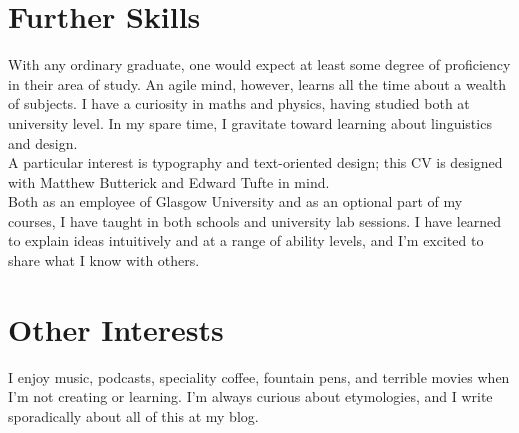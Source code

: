 \documentclass{tufte-handout}
\begin{document}
\section{Further Skills}
With any ordinary graduate, one would expect at least some degree of proficiency in their area of study. An agile mind, however, learns all the time about a wealth of subjects. I have a curiosity in maths and physics, having studied both at university level. In my spare time, I gravitate toward learning about linguistics and design.\\
A particular interest is typography and text-oriented design; this CV is designed with Matthew Butterick and Edward Tufte in mind. \\
Both as an employee of Glasgow University and as an optional part of my courses, I have taught in both schools and university lab sessions. I have learned to explain ideas intuitively and at a range of ability levels, and I'm excited to share what I know with others.

\section{Other Interests}
I enjoy music, podcasts, speciality coffee, fountain pens, and terrible movies when I'm not creating or learning. I'm always curious about etymologies, and I write sporadically about all of this at my blog. 
\end{document}
